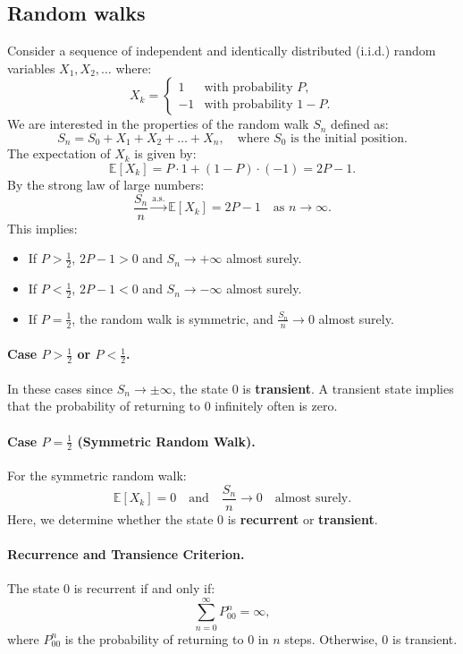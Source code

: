 \subsection{Random walks} 
Consider a sequence of independent and identically distributed (i.i.d.) random variables \( X_1, X_2, \ldots \) where:  
\[
X_k = 
\begin{cases} 
1 & \text{with probability } P, \\
-1 & \text{with probability } 1-P. 
\end{cases}
\]  
We are interested in the properties of the random walk \( S_n \) defined as:
\[
S_n = S_0 + X_1 + X_2 + \ldots + X_n, \quad \text{where } S_0 \text{ is the initial position.}
\]  
The expectation of \( X_k \) is given by:  
\[
\mathbb{E}[X_k] = P \cdot 1 + (1-P) \cdot (-1) = 2P - 1.
\]
By the strong law of large numbers:  
\[
\frac{S_n}{n} \xrightarrow{\text{a.s.}} \mathbb{E}[X_k] = 2P - 1 \quad \text{as } n \to \infty.
\]  
This implies:  
\begin{itemize}
    \item If \( P > \frac{1}{2} \), \( 2P - 1 > 0 \) and \( S_n \to +\infty \) almost surely.
    \item If \( P < \frac{1}{2} \), \( 2P - 1 < 0 \) and \( S_n \to -\infty \) almost surely.
    \item If \( P = \frac{1}{2} \), the random walk is symmetric, and \( \frac{S_n}{n} \to 0 \) almost surely.
\end{itemize}

\paragraph{Case \( P > \frac{1}{2} \) or \( P < \frac{1}{2} \).}  
In these cases since \( S_n \to \pm\infty \), the state \( 0 \) is \textbf{transient}. A transient state implies that the probability of returning to \( 0 \) infinitely often is zero.

\paragraph{Case \( P = \frac{1}{2} \) (Symmetric Random Walk).}  
For the symmetric random walk:  
\[
\mathbb{E}[X_k] = 0 \quad \text{and} \quad \frac{S_n}{n} \to 0 \quad \text{almost surely.}
\]  
Here, we determine whether the state \( 0 \) is \textbf{recurrent} or \textbf{transient}.  

\paragraph{Recurrence and Transience Criterion.}  
The state \( 0 \) is recurrent if and only if:  
\[
\sum_{n=0}^\infty P^n_{00} = \infty,
\]  
where \( P^n_{00} \) is the probability of returning to \( 0 \) in \( n \) steps. Otherwise, \( 0 \) is transient.

